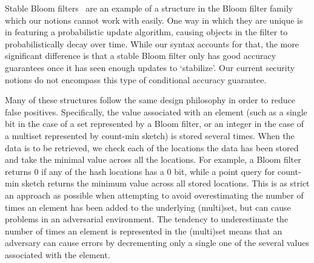 
Stable Bloom filters~\cite{xxx} are an example of a structure in the Bloom filter family which our notions cannot work with easily. One way in which they are unique is in featuring a probabilistic update algorithm, causing objects in the filter to probabilistically decay over time. While our syntax accounts for that, the more significant difference is that a stable Bloom filter only has good accuracy guarantees once it has seen enough updates to `stabilize'. Our current security notions do not encompass this type of conditional accuracy guarantee.

Many of these structures follow the same design philosophy in order to reduce false positives. Specifically, the value associated with an element (such as a single bit in the case of a set represented by a Bloom filter, or an integer in the case of a multiset represented by count-min sketch) is stored several times. When the data is to be retrieved, we check each of the locations the data has been stored and take the minimal value across all the locations. For example, a Bloom filter returns 0 if any of the hash locations has a 0 bit, while a point query for count-min sketch returns the minimum value across all stored locations. This is as strict an approach as possible when attempting to avoid overestimating the number of times an element has been added to the underlying (multi)set, but can cause problems in an adversarial environment. The tendency to underestimate the number of times an element is represented in the (multi)set means that an adversary can cause errors by decrementing only a single one of the several values associated with the element.

